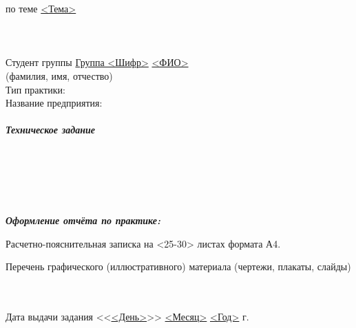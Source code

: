 \documentclass[utf8x, 10pt, oneside, a4paper]{article}
\begin{document}
	\begin{flushleft}
		по теме  \uline{<Тема>\hfill}
		\baselineskip=17pt
		\\ \uline{ \hfill}
		\\ \uline{ \hfill}
		\\ \baselineskip=9pt\hfill
		\\ \baselineskip=10pt Студент группы  \uline{\hspace*{0.5cm}}\uline{Группа <Шифр>}\uline{\hspace*{0.5cm}}
		\center \baselineskip=7pt \uline{ \hfill} 
		\\ \fontsize{10pt}{\baselineskip}\selectfont(фамилия, имя, отчество)
		\baselineskip=15pt
		 \\Тип практики: \uline{ \hfill} %
		\baselineskip=15pt
		\\  Название предприятия: \uline{ \hfill} %
		\\ \hfill
		\\ \textbf{\textit{Техническое задание}} \uline{\hfill}
		\\ \uline{\hfill}
		\\ \uline{\hfill}
		\\ \uline{\hfill}
		\\ \uline{\hfill}
		\\ \uline{\hfill}
		\\ \uline{\hfill}
	\end{flushleft}

	\begin{flushleft}
		\baselineskip=14pt
		\textbf{\textit{Оформление отчёта по практике:}}
		
		Расчетно-пояснительная записка на <25-30> листах формата А4. %

		Перечень графического (иллюстративного) материала (чертежи, плакаты, слайды)
		\\ \uline{\hfill} \baselineskip=15pt
		\\ \uline{\hfill}
		\\ \uline{\hfill}
	\end{flushleft}

	\begin{flushleft}
		Дата выдачи задания <<\uline{<День>}>> \uline{<Месяц>} \uline{<Год>} г. %
	\end{flushleft}
\end{document}
